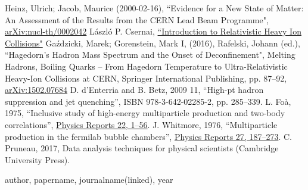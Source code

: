 \begin{thebibliography}{50}
 Heinz, Ulrich; Jacob, Maurice (2000-02-16), ``Evidence for a New State of Matter: An Assessment of the Results from the CERN Lead Beam Programme", \href{https://arxiv.org/abs/nucl-th/0002042}{arXiv:nucl-th/0002042}
 László P. Csernai, \href{http://www.csernai.no/Csernai-textbook.pdf}{``Introduction to Relativistic Heavy Ion Collisions"}
 Gaździcki, Marek; Gorenstein, Mark I, (2016), Rafelski, Johann (ed.), ``Hagedorn's Hadron Mass Spectrum and the Onset of Deconfinement", Melting Hadrons, Boiling Quarks – From Hagedorn Temperature to Ultra-Relativistic Heavy-Ion Collisions at CERN, Springer International Publishing, pp. 87–92, \href{https://arxiv.org/abs/1502.07684}{arXiv:1502.07684}
 D. d’Enterria and B. Betz, 2009 11, ``High-pt hadron suppression and jet quenching”, ISBN 978-3-642-02285-2, pp. 285–339.
 L. Foà, 1975, ``Inclusive study of high-energy multiparticle production and two-body correlations”, \href{http://dx.doi.org/https://doi.org/10.1016/0370-1573(75)90050-2}{Physics Reports 22, 1–56}.
 J. Whitmore, 1976, ``Multiparticle production in the fermilab bubble chambers”, \href{http://dx.doi.org/https://doi.org/10.1016/0370-1573(76)90004-1}{Physics Reports 27, 187–273}.
 C. Pruneau, 2017, Data analysis techniques for physical scientists (Cambridge University Press).
\end{thebibliography}


author, papername, journalname(linked), year